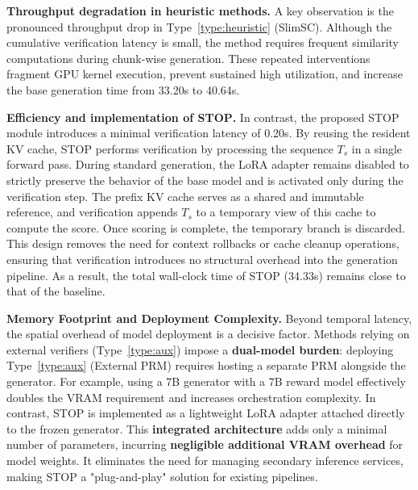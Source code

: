 \documentclass[11pt]{article}
\theoremstyle{plain}
\begin{document}
\noindent\textbf{Throughput degradation in heuristic methods.}
A key observation is the pronounced throughput drop in Type~\ref{type:heuristic} (SlimSC). 
Although the cumulative verification latency is small, the method requires frequent similarity computations during chunk-wise generation. 
These repeated interventions fragment GPU kernel execution, prevent sustained high utilization, and increase the base generation time from 33.20s to 40.64s.

\noindent\textbf{Efficiency and implementation of \textsc{STOP}.}
In contrast, the proposed \textsc{STOP} module introduces a minimal verification latency of 0.20s. 
By reusing the resident KV cache, \textsc{STOP} performs verification by processing the sequence $T_s$ in a single forward pass. 
During standard generation, the LoRA adapter remains disabled to strictly preserve the behavior of the base model and is activated only during the verification step. 
The prefix KV cache serves as a shared and immutable reference, and verification appends $T_s$ to a temporary view of this cache to compute the score. 
Once scoring is complete, the temporary branch is discarded. 
This design removes the need for context rollbacks or cache cleanup operations, ensuring that verification introduces no structural overhead into the generation pipeline. 
As a result, the total wall-clock time of \textsc{STOP} (34.33s) remains close to that of the baseline.

\noindent\textbf{Memory Footprint and Deployment Complexity.}
Beyond temporal latency, the spatial overhead of model deployment is a decisive factor.
Methods relying on external verifiers (Type~\ref{type:aux}) impose a \textbf{dual-model burden}: deploying Type~\ref{type:aux} (External PRM) requires hosting a separate PRM alongside the generator.
For example, using a 7B generator with a 7B reward model effectively doubles the VRAM requirement and increases orchestration complexity.
In contrast, \textsc{STOP} is implemented as a lightweight LoRA adapter attached directly to the frozen generator.
This \textbf{integrated architecture} adds only a minimal number of parameters, incurring \textbf{negligible additional VRAM overhead} for model weights.
It eliminates the need for managing secondary inference services, making \textsc{STOP} a "plug-and-play" solution for existing pipelines.

\end{document}
